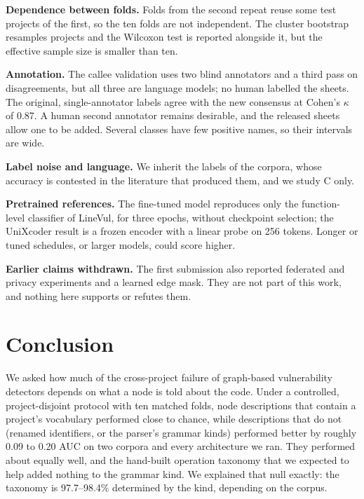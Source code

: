 \documentclass[pdflatex,sn-basic]{sn-jnl}
\theoremstyle{thmstyleone}%
\newcommand{\numdeltaMax}{0.20}
\newcommand{\numdeltaMin}{0.09}
\newcommand{\numdeterminismMax}{98.4}
\newcommand{\numdeterminismMin}{97.7}
\newcommand{\numdevignOrigKappa}{0.87}
\begin{document}
\textbf{Dependence between folds.} Folds from the second repeat reuse some test
projects of the first, so the ten folds are not independent. The cluster
bootstrap resamples projects and the Wilcoxon test is reported alongside it, but
the effective sample size is smaller than ten.

\textbf{Annotation.} The callee validation uses two blind annotators and a
third pass on disagreements, but all three are language models; no human
labelled the sheets. The original, single-annotator labels agree with the new
consensus at Cohen's $\kappa$ of \numdevignOrigKappa{}. A human second
annotator remains desirable, and the released sheets allow one to be added.
Several classes have few positive names, so their intervals are wide.

\textbf{Label noise and language.} We inherit the labels of the corpora, whose
accuracy is contested in the literature that produced them, and we study C only.

\textbf{Pretrained references.} The fine-tuned model reproduces only the
function-level classifier of LineVul, for three epochs, without checkpoint
selection; the UniXcoder result is a frozen encoder with a linear probe on 256
tokens. Longer or tuned schedules, or larger models, could score higher.

\textbf{Earlier claims withdrawn.} The first submission also reported federated
and privacy experiments and a learned edge mask. They are not part of this
work, and nothing here supports or refutes them.


\section{Conclusion}
\label{sec:conclusion}

We asked how much of the cross-project failure of graph-based vulnerability
detectors depends on what a node is told about the code. Under a controlled,
project-disjoint protocol with ten matched folds, node descriptions that contain
a project's vocabulary performed close to chance, while descriptions that do
not (renamed identifiers, or the parser's grammar kinds) performed better by
roughly \numdeltaMin{} to \numdeltaMax{} AUC on two corpora and every architecture we ran. They performed
about equally well, and the hand-built operation taxonomy that we expected to
help added nothing to the grammar kind. We explained that null exactly: the
taxonomy is \numdeterminismMin{}--\numdeterminismMax{}\% determined by the kind, depending on the corpus.
\end{document}
